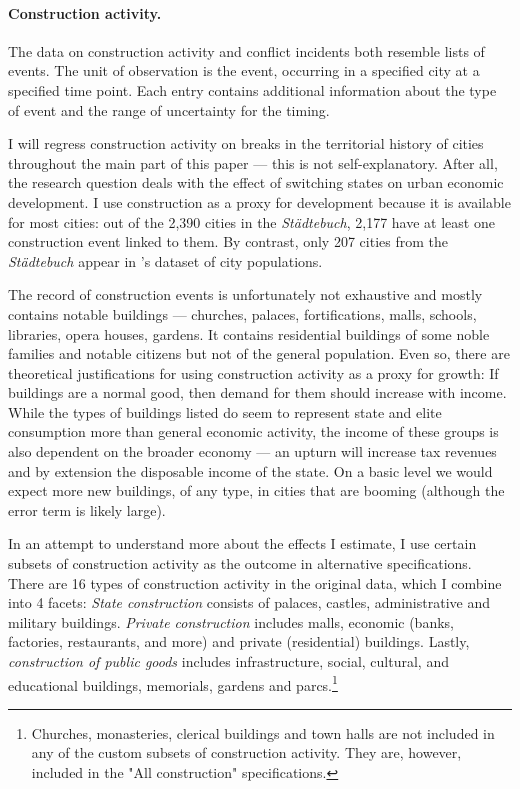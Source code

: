 \documentclass[11pt, a4paper]{article}
\begin{document}
\paragraph{Construction activity.}

The data on construction activity \citep{pt5} and conflict incidents \citep{pt6} both resemble lists of events. The unit of observation is the event, occurring in a specified city at a specified time point. Each entry contains additional information about the type of event and the range of uncertainty for the timing.

I will regress construction activity on breaks in the territorial history of cities throughout the main part of this paper --- this is not self-explanatory. After all, the research question deals with the effect of switching states on urban economic development. I use construction as a proxy for development because it is available for most cities: out of the 2,390 cities in the \textit{Städtebuch}, 2,177 have at least one construction event linked to them. By contrast, only 207 cities from the \textit{Städtebuch} appear in \cite{bairoch1988}'s dataset of city populations.

The record of construction events is unfortunately not exhaustive and mostly contains notable buildings --- churches, palaces, fortifications, malls, schools, libraries, opera houses, gardens. It contains residential buildings of some noble families and notable citizens but not of the general population. Even so, there are theoretical justifications for using construction activity as a proxy for growth: If buildings are a normal good, then demand for them should increase with income. While the types of buildings listed do seem to represent state and elite consumption more than general economic activity, the income of these groups is also dependent on the broader economy --- an upturn will increase tax revenues and by extension the disposable income of the state. On a basic level we would expect more new buildings, of any type, in cities that are booming (although the error term is likely large).

In an attempt to understand more about the effects I estimate, I use certain subsets of construction activity as the outcome in alternative specifications. There are 16 types of construction activity in the original data, which I combine into 4 facets: \textit{State construction} consists of palaces, castles, administrative and military buildings. \textit{Private construction} includes malls, economic (banks, factories, restaurants, and more) and private (residential) buildings. Lastly, \textit{construction of public goods} includes infrastructure, social, cultural, and educational buildings, memorials, gardens and parcs.\footnote
{
Churches, monasteries, clerical buildings and town halls are not included in any of the custom subsets of construction activity. They are, however, included in the "All construction" specifications.
}
\end{document}

